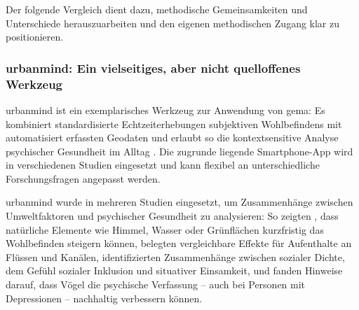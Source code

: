 Der folgende Vergleich dient dazu, methodische Gemeinsamkeiten und Unterschiede herauszuarbeiten und den eigenen methodischen Zugang klar zu positionieren.


\subsubsection*{\gls{urbanmind}: Ein vielseitiges, aber nicht quelloffenes Werkzeug}

\gls{urbanmind} ist ein exemplarisches Werkzeug zur Anwendung von \acrshort{gema}: Es kombiniert standardisierte Echtzeiterhebungen subjektiven Wohlbefindens mit automatisiert erfassten Geodaten und erlaubt so die kontextsensitive Analyse psychischer Gesundheit im Alltag \parencite{bakolisUrbanMindUsing2018}. Die zugrunde liegende Smartphone-App wird in verschiedenen Studien eingesetzt und kann flexibel an unterschiedliche Forschungsfragen angepasst werden.

\gls{urbanmind} wurde in mehreren Studien eingesetzt, um Zusammenhänge zwischen Umweltfaktoren und psychischer Gesundheit zu analysieren: So zeigten \textcite{bakolisUrbanMindUsing2018}, dass natürliche Elemente wie Himmel, Wasser oder Grünflächen kurzfristig das Wohlbefinden steigern können, \textcite{bergouMentalHealthBenefits2022} belegten vergleichbare Effekte für Aufenthalte an Flüssen und Kanälen, \textcite{hammoudLonelyCrowdInvestigating2021} identifizierten Zusammenhänge zwischen sozialer Dichte, dem Gefühl sozialer Inklusion und situativer Einsamkeit, und \textcite{hammoudSmartphonebasedEcologicalMomentary2022} fanden Hinweise darauf, dass Vögel die psychische Verfassung -- auch bei Personen mit Depressionen -- nachhaltig verbessern können.


